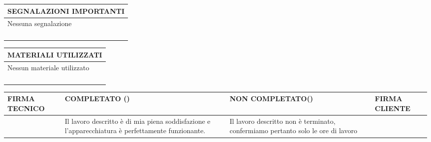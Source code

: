 \documentclass[a4paper,11pt]{article}
\def \materialiA  {Nessun materiale utilizzato}
\def \materialiB  {}
\def \materialiC  {}
\def \materialiD  {}
\def \materialiE  {}
\def \segnalazioniA  {Nessuna segnalazione}
\def \segnalazioniB  {}
\def \segnalazioniC  {}
\def \segnalazioniD  {}
\def \segnalazioniE  {}
\def \completato {}
\def \noncompletato {}
\begin{document}
\begin{center}
    \begin{table}[h!]
        \begin{tabular}{|p{20cm}|}
            \hline
            \rowcolor{Gray}            
            \textbf{SEGNALAZIONI IMPORTANTI} \\
            \hline
            \segnalazioniA \\
            \segnalazioniB \\
            \segnalazioniC \\
            \segnalazioniD \\
            \segnalazioniE \\
            \hline
        \end{tabular}    
    \end{table}
\end{center}
\begin{center}
    \begin{table}[h!]        
        \begin{tabular}{|p{20cm}|}
            \hline            
            \rowcolor{Gray}
            \textbf{MATERIALI UTILIZZATI} \\
            \hline
            \materialiA \\
            \materialiB \\
            \materialiC \\
            \materialiD \\
            \materialiE \\
            \hline
        \end{tabular}    
    \end{table}
\end{center}
\begin{center}
    \begin{table}[h!]
        \begin{tabular}{|p{4.5cm} | p{4cm} | p{5cm} | p{4.5cm}|} 
            \hline
            \rowcolor{Gray}
            \textbf{FIRMA TECNICO} & \textbf{COMPLETATO (\completato)} & \textbf{NON COMPLETATO(\noncompletato)} & \textbf{FIRMA CLIENTE}  \\
            \hline
            & 
            Il lavoro descritto è di mia piena soddisfazione e l'apparecchiatura è perfettamente funzionante. 
            & Il lavoro descritto non è terminato, confermiamo pertanto solo le ore di lavoro 
            &  \\
            \hline
        \end{tabular}    
    \end{table}
\end{center}
\end{document}
